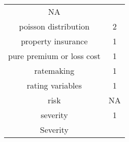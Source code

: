\documentclass[]{book}
\begin{document}
\begin{longtable}[]{@{}cc@{}}
\begin{minipage}[t]{0.05\columnwidth}
NA\strut
\end{minipage}\tabularnewline
\begin{minipage}[t]{0.43\columnwidth}\centering\strut
poisson distribution\strut
\end{minipage} & \begin{minipage}[t]{0.05\columnwidth}\centering\strut
2\strut
\end{minipage}\tabularnewline
\begin{minipage}[t]{0.43\columnwidth}\centering\strut
property insurance\strut
\end{minipage} & \begin{minipage}[t]{0.05\columnwidth}\centering\strut
1\strut
\end{minipage}\tabularnewline
\begin{minipage}[t]{0.43\columnwidth}\centering\strut
pure premium or loss cost\strut
\end{minipage} & \begin{minipage}[t]{0.05\columnwidth}\centering\strut
1\strut
\end{minipage}\tabularnewline
\begin{minipage}[t]{0.43\columnwidth}\centering\strut
ratemaking\strut
\end{minipage} & \begin{minipage}[t]{0.05\columnwidth}\centering\strut
1\strut
\end{minipage}\tabularnewline
\begin{minipage}[t]{0.43\columnwidth}\centering\strut
rating variables\strut
\end{minipage} & \begin{minipage}[t]{0.05\columnwidth}\centering\strut
1\strut
\end{minipage}\tabularnewline
\begin{minipage}[t]{0.43\columnwidth}\centering\strut
risk\strut
\end{minipage} & \begin{minipage}[t]{0.05\columnwidth}\centering\strut
NA\strut
\end{minipage}\tabularnewline
\begin{minipage}[t]{0.43\columnwidth}\centering\strut
severity\strut
\end{minipage} & \begin{minipage}[t]{0.05\columnwidth}\centering\strut
1\strut
\end{minipage}\tabularnewline
\begin{minipage}[t]{0.43\columnwidth}\centering\strut
Severity\strut

\end{minipage}
\end{longtable}
\end{document}
